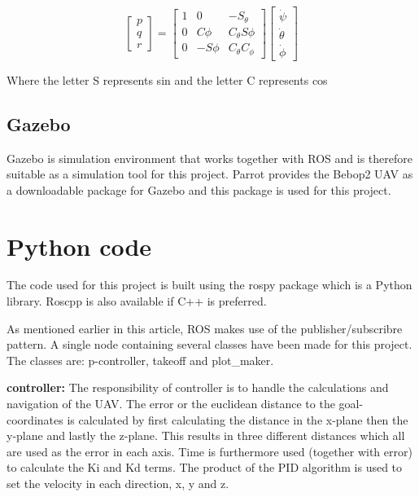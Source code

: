 \documentclass[conference]{IEEEtran}
\begin{document}
\begin{equation}
\begin{bmatrix}
p\\
q\\
r 
\end{bmatrix}=
\begin{bmatrix}
1 & 0 & -S_\theta\\
0 & C\phi & C_\theta S\phi \\
0 & -S\phi & C_\theta C_\phi
\end{bmatrix}
\begin{bmatrix}
\dot{\psi}\\
\dot{\theta}\\
\dot{\phi}
\end{bmatrix}\label{eq9}
\end{equation}

Where the letter S represents sin and the letter C represents cos \cite{b2}\cite{b3}
\newpage

\subsection{Gazebo}
Gazebo is simulation environment that works together with ROS and is therefore suitable as a simulation tool for this project. Parrot provides the Bebop2 UAV as a downloadable package for Gazebo and this package is used for this project.

\section{Python code}
The code used for this project is built using the rospy package which is a Python library. Roscpp is also available if C++ is preferred. 

As mentioned earlier in this article, ROS makes use of the publisher/subscribre pattern. A single node containing several classes have been made for this project. The classes are: p-controller, takeoff and plot\_maker. 

\textbf{controller:} The responsibility of controller is to handle the calculations and navigation of the UAV. The error or the euclidean distance to the goal-coordinates is calculated by first calculating the distance in the x-plane then the y-plane and lastly the z-plane. This results in three different distances which all are used as the error in each axis. Time is furthermore used (together with error) to calculate the Ki and Kd terms. The product of the PID algorithm is used to set the velocity in each direction, x, y and z.
\end{document}
